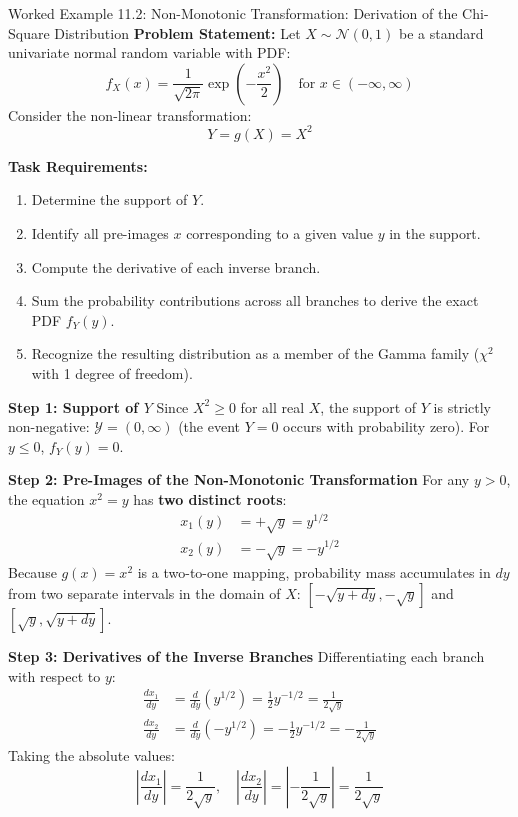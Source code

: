 \begin{examplebox}[breakable]{Worked Example 11.2: Non-Monotonic Transformation: Derivation of the Chi-Square Distribution}
\textbf{Problem Statement:}
Let $X \sim \mathcal{N}(0, 1)$ be a standard univariate normal random variable with PDF:
\begin{equation}
f_X(x) = \frac{1}{\sqrt{2\pi}} \exp\left( -\frac{x^2}{2} \right) \quad \text{for } x \in (-\infty, \infty)
\end{equation}
Consider the non-linear transformation:
\begin{equation}
Y = g(X) = X^2
\end{equation}

\textbf{Task Requirements:}
\begin{enumerate}
    \item Determine the support of $Y$.
    \item Identify all pre-images $x$ corresponding to a given value $y$ in the support.
    \item Compute the derivative of each inverse branch.
    \item Sum the probability contributions across all branches to derive the exact PDF $f_Y(y)$.
    \item Recognize the resulting distribution as a member of the Gamma family ($\chi^2$ with 1 degree of freedom).
\end{enumerate}

\tcblower

\textbf{Step 1: Support of $Y$}
Since $X^2 \ge 0$ for all real $X$, the support of $Y$ is strictly non-negative: $\mathcal{Y} = (0, \infty)$ (the event $Y = 0$ occurs with probability zero). For $y \le 0$, $f_Y(y) = 0$.

\textbf{Step 2: Pre-Images of the Non-Monotonic Transformation}
For any $y > 0$, the equation $x^2 = y$ has \textbf{two distinct roots}:
\begin{align}
x_1(y) &= +\sqrt{y} = y^{1/2} \\
x_2(y) &= -\sqrt{y} = -y^{1/2}
\end{align}
Because $g(x) = x^2$ is a two-to-one mapping, probability mass accumulates in $dy$ from two separate intervals in the domain of $X$: $[-\sqrt{y+dy}, -\sqrt{y}]$ and $[\sqrt{y}, \sqrt{y+dy}]$.

\textbf{Step 3: Derivatives of the Inverse Branches}
Differentiating each branch with respect to $y$:
\begin{align}
\frac{dx_1}{dy} &= \frac{d}{dy}\left( y^{1/2} \right) = \frac{1}{2}y^{-1/2} = \frac{1}{2\sqrt{y}} \\
\frac{dx_2}{dy} &= \frac{d}{dy}\left( -y^{1/2} \right) = -\frac{1}{2}y^{-1/2} = -\frac{1}{2\sqrt{y}}
\end{align}
Taking the absolute values:
\begin{equation}
\left| \frac{dx_1}{dy} \right| = \frac{1}{2\sqrt{y}}, \quad \left| \frac{dx_2}{dy} \right| = \left| -\frac{1}{2\sqrt{y}} \right| = \frac{1}{2\sqrt{y}}
\end{equation}


\end{examplebox}
